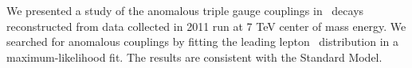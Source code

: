 We presented a study of the anomalous triple gauge couplings in \wwll\
decays reconstructed from data collected in 2011 run at 7 TeV center
of mass energy. We searched for anomalous couplings by fitting the
leading lepton \pt\ distribution in a maximum-likelihood fit. The
results are consistent with the Standard Model. 
